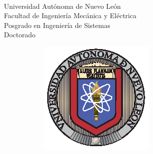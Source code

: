 \thispagestyle{empty}
\vspace{10 cm}
\begin{scshape}
\begin{center}
	{$\,$} \\[20 mm]
	{\Large{Universidad Autónoma de Nuevo León}} \\[5mm]
	{\large{Facultad de Ingeniería Mecánica y Eléctrica}} \\[5mm]
	{\large{Posgrado en Ingeniería de Sistemas}} \\[5 mm]
	{\large{Doctorado}}
	\vskip16mm
	\begin{figure}[h!]
		\centering
		\begin{subfigure}{0.3\linewidth}
			\includegraphics[width=\linewidth]{fig/uanl}
		\end{subfigure}
		\hspace{15 mm}
		\begin{subfigure}{0.2\linewidth}

\end{subfigure}
\end{figure}
\end{center}
\end{scshape}
